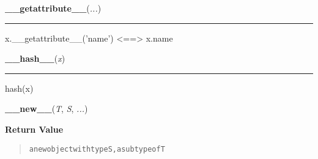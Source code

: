     \label{object:__getattribute__}

    \vspace{0.5ex}

    \begin{boxedminipage}{\textwidth}

    \raggedright \textbf{\_\_getattribute\_\_}(\textit{...})

    \vspace{-1.5ex}

    \rule{\textwidth}{0.5\fboxrule}
    x.\_\_getattribute\_\_('name') {\textless}=={\textgreater} x.name

    \vspace{1ex}

    \end{boxedminipage}

    \label{object:__hash__}

    \vspace{0.5ex}

    \begin{boxedminipage}{\textwidth}

    \raggedright \textbf{\_\_hash\_\_}(\textit{x})

    \vspace{-1.5ex}

    \rule{\textwidth}{0.5\fboxrule}
    hash(x)

    \vspace{1ex}

    \end{boxedminipage}

    \label{object:__new__}

    \vspace{0.5ex}

    \begin{boxedminipage}{\textwidth}

    \raggedright \textbf{\_\_new\_\_}(\textit{T}, \textit{S}, \textit{...})

    \vspace{1ex}

      \textbf{Return Value}
      \begin{quote}
\begin{alltt}
a new object with type S, a subtype of T
\end{alltt}

      \end{quote}

    \vspace{1ex}

    \end{boxedminipage}

